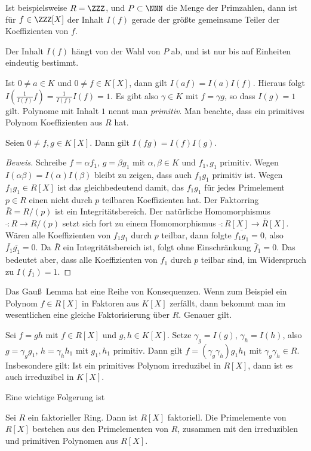 \documentclass[12pt,a4paper,twoside]{article}
\newcommand{\ei}[1]{\emph{#1}\index{#1}}
\begin{document}
Ist beispielsweise $R=\ZZZ$, und $P\subset\NNN$ die Menge der Primzahlen, dann
ist f\"ur $f\in\ZZZ[X]$ der Inhalt $I(f)$ gerade der gr\"o\ss te gemeinsame
Teiler der Koeffizienten von $f$.

Der Inhalt $I(f)$ h\"angt von der Wahl von $P$ ab, und ist nur bis auf
Einheiten eindeutig bestimmt.

Ist $0\ne a\in K$ und $0\ne f\in K[X]$, dann gilt $I(af)=I(a)I(f)$. Hieraus
folgt $I(\frac{1}{I(f)}f)=\frac{1}{I(f)}I(f)=1$. Es gibt also $\gamma\in K$
mit $f=\gamma g$, so dass $I(g)=1$ gilt. Polynome mit Inhalt $1$ nennt man
\ei{primitiv}. Man beachte, dass ein primitives Polynom Koeffizienten aus $R$
hat.

\begin{Satz}
  Seien $0\ne f,g\in K[X]$. Dann gilt $I(fg)=I(f)I(g)$.
\end{Satz}
\begin{proof}[Beweis]
  Schreibe $f=\alpha f_1$, $g=\beta g_1$ mit $\alpha,\beta\in K$ und $f_1,g_1$
  primitiv. Wegen $I(\alpha\beta)=I(\alpha)I(\beta)$ bleibt zu zeigen, dass
  auch $f_1g_1$ primitiv ist. Wegen $f_1g_1\in R[X]$ ist das gleichbedeutend
  damit, das $f_1g_1$ f\"ur jedes Primelement $p\in R$ einen nicht durch $p$
  teilbaren Koeffizienten hat. Der Faktorring $\bar{R}=R/(p)$ ist ein
  Integrit\"atsbereich. Der nat\"urliche Homomorphismus $\bar{ }:R\to R/(p)$
  setzt sich fort zu einem Homomorphismus $\bar{ }:R[X]\to\bar{R}[X]$. W\"aren
  alle Koeffizienten von $f_1g_1$ durch $p$ teilbar, dann folgte
  $\overline{f_1g_1}=0$, also $\bar{f_1}\bar{g_1}=0$. Da $\bar{R}$ ein
  Integrit\"atsbereich ist, folgt ohne Einschr\"ankung $\bar f_1=0$. Das
  bedeutet aber, dass alle Koeffizienten von $f_1$ durch $p$ teilbar sind, im
  Widerspruch zu $I(f_1)=1$.
\end{proof}
Das Gau\ss\ Lemma hat eine Reihe von Konsequenzen. Wenn zum Beispiel ein
Polynom $f\in R[X]$ in Faktoren aus $K[X]$ zerf\"allt, dann bekommt man im
wesentlichen eine gleiche Faktorisierung \"uber $R$. Genauer gilt.
\begin{Korollar}
  Sei $f=gh$ mit $f\in R[X]$ und $g,h\in K[X]$. Setze $\gamma_g=I(g)$,
  $\gamma_h=I(h)$, also $g=\gamma_g g_1$, $h=\gamma_h h_1$ mit $g_1,h_1$
  primitiv. Dann gilt $f=(\gamma_g\gamma_h)g_1h_1$ mit $\gamma_g\gamma_h\in
  R$. Insbesondere gilt: Ist ein primitives Polynom irreduzibel in $R[X]$,
  dann ist es auch irreduzibel in $K[X]$.
\end{Korollar}
Eine wichtige Folgerung ist
\begin{Korollar}
  Sei $R$ ein faktorieller Ring. Dann ist $R[X]$ faktoriell. Die Primelemente
  von $R[X]$ bestehen aus den Primelementen von $R$, zusammen mit den
  irreduziblen und primitiven Polynomen aus $R[X]$.
\end{Korollar}
\end{document}
